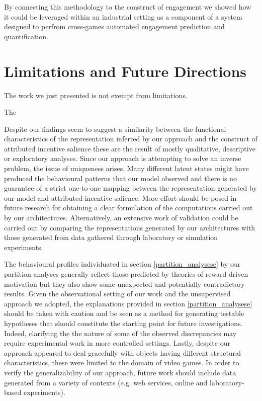 By connecting this methodology to the construct of engagement we showed how it could be leveraged within an industrial setting as a component of a system designed to perfrom cross-games automated engagement prediction and quantification.

\section{Limitations and Future Directions}
\label{discussion_limitations}
The work we just presented is not exempt from limitations. 

The 

Despite our findings seem to suggest a similarity between the functional characteristics of the representation inferred by our approach and the construct of attributed incentive salience these are the result of mostly qualitative, descriptive or exploratory analyses. 
Since our approach is attempting to solve an inverse problem, the issue of uniqueness arises. Many different latent states might have produced the behavioural patterns that our model observed and there is no guarantee of a strict one-to-one mapping between the representation generated by our model and attributed incentive salience.  More effort should be posed in future research for obtaining a clear formulation of the computations carried out by our architectures. Alternatively, an extensive work of validation could be carried out by comparing the representations generated by our architectures with those generated from data gathered through laboratory or simulation experiments. 

The behavioural profiles individuated in section \ref{partition_analysese} by our partition analyses generally reflect those predicted by theories of reward-driven motivation \cite{thorndike1927law,skinner1965science,berridge2004motivation} but they also show some unexpected and potentially contradictory results. Given the observational setting of our work and the unsupervised approach we adopted, the explanations provided in section \ref{partition_analysese} should be taken with caution and be seen as a method for generating testable hypotheses that should constitute the starting point for future investigations. Indeed, clarifying the the nature of some of the observed discrepancies may require experimental work in more controlled settings. Lastly, despite our approach appeared to deal gracefully with objects having different structural characteristics, these were limited to the domain of video games. In order to verify the generalizability of our approach, future work should include data generated from a variety of contexts (e.g. web services, online and laboratory-based experiments).  

